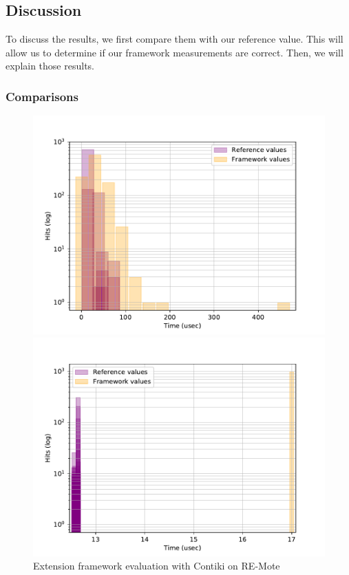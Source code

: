 \subsection{Discussion}

To discuss the results, we first compare them with our reference value.
This will allow us to determine if our framework measurements are correct.
Then, we will explain those results.

\subsubsection{Comparisons}

\begin{figure}[!ht]
  \begin{minipage}{.45\textwidth}
      \centering
      \includegraphics[scale=.4]{assets/comparison-extension-framework-contiki-remote.pdf}
      \caption{Extension framework evaluation with Contiki on RE-Mote\label{fig:comparison-extension-framework-contiki-remote}}
  \end{minipage}\hfill
  \begin{minipage}{.45\textwidth}        
      \centering
      \includegraphics[scale=.4]{assets/comparison-extension-framework-riot-remote.pdf}

\end{minipage}
\end{figure}
